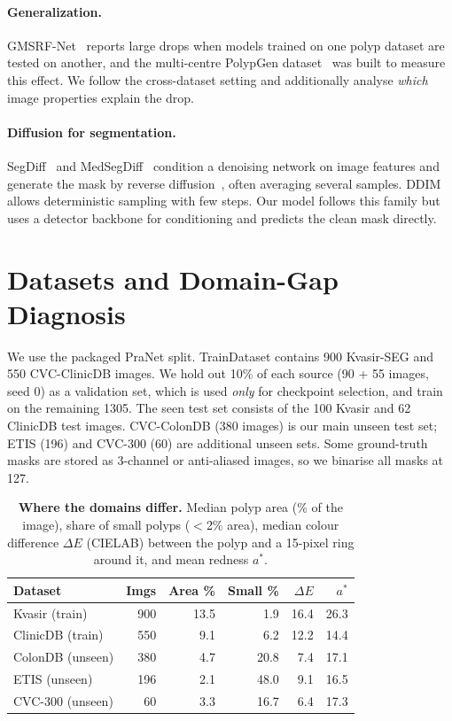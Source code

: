 \documentclass[10pt,twocolumn,letterpaper]{article}
\begin{document}
\paragraph{Generalization.} GMSRF-Net~\cite{srivastava2022gmsrf} reports large drops when models trained on one polyp dataset are tested on another, and the multi-centre PolypGen dataset~\cite{ali2023polypgen} was built to measure this effect. We follow the cross-dataset setting and additionally analyse \emph{which} image properties explain the drop.

\paragraph{Diffusion for segmentation.} SegDiff~\cite{amit2021segdiff} and MedSegDiff~\cite{wu2023medsegdiff} condition a denoising network on image features and generate the mask by reverse diffusion~\cite{ho2020ddpm}, often averaging several samples. DDIM~\cite{song2021ddim} allows deterministic sampling with few steps. Our model follows this family but uses a detector backbone for conditioning and predicts the clean mask directly.

\section{Datasets and Domain-Gap Diagnosis}
\label{sec:data}

We use the packaged PraNet split. TrainDataset contains 900 Kvasir-SEG and 550 CVC-ClinicDB images. We hold out 10\% of each source (90 + 55 images, seed 0) as a validation set, which is used \emph{only} for checkpoint selection, and train on the remaining 1305. The seen test set consists of the 100 Kvasir and 62 ClinicDB test images. CVC-ColonDB (380 images) is our main unseen test set; ETIS (196) and CVC-300 (60) are additional unseen sets. Some ground-truth masks are stored as 3-channel or anti-aliased images, so we binarise all masks at 127.

\begin{table}[t]
\centering
\footnotesize
\setlength{\tabcolsep}{3pt}
\begin{tabular}{@{}lrrrrr@{}}
\toprule
Dataset & Imgs & Area \% & Small \% & $\Delta E$ & $a^*$ \\
\midrule
Kvasir (train) & 900 & 13.5 & 1.9 & 16.4 & 26.3 \\
ClinicDB (train) & 550 & 9.1 & 6.2 & 12.2 & 14.4 \\
\midrule
ColonDB (unseen) & 380 & 4.7 & 20.8 & 7.4 & 17.1 \\
ETIS (unseen) & 196 & 2.1 & 48.0 & 9.1 & 16.5 \\
CVC-300 (unseen) & 60 & 3.3 & 16.7 & 6.4 & 17.3 \\
\bottomrule
\end{tabular}
\caption{\textbf{Where the domains differ.} Median polyp area (\% of the image), share of small polyps ($<$2\% area), median colour difference $\Delta E$ (CIELAB) between the polyp and a 15-pixel ring around it, and mean redness $a^*$.}
\label{tab:data}
\end{table}
\end{document}
